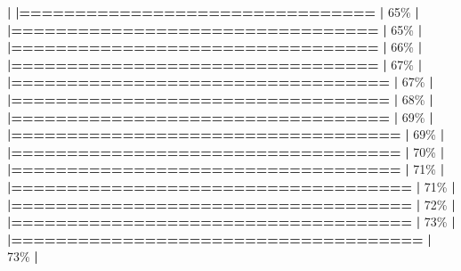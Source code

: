 \documentclass[
]{book}
\newenvironment{Shaded}{\begin{snugshade}}{\end{snugshade}}
\newcommand{\DecValTok}[1]{\textcolor[rgb]{0.00,0.00,0.81}{#1}}
\newcommand{\ErrorTok}[1]{\textcolor[rgb]{0.64,0.00,0.00}{\textbf{#1}}}
\newcommand{\NormalTok}[1]{#1}
\newcommand{\SpecialCharTok}[1]{\textcolor[rgb]{0.81,0.36,0.00}{\textbf{#1}}}
\begin{document}
\begin{Shaded}
\begin{Highlighting}[]
  \SpecialCharTok{|}                                                        
  \ErrorTok{|================================}                  \ErrorTok{|}  \DecValTok{65}\NormalTok{\%}
  \SpecialCharTok{|}                                                        
  \ErrorTok{|=================================}                 \ErrorTok{|}  \DecValTok{65}\NormalTok{\%}
  \SpecialCharTok{|}                                                        
  \ErrorTok{|=================================}                 \ErrorTok{|}  \DecValTok{66}\NormalTok{\%}
  \SpecialCharTok{|}                                                        
  \ErrorTok{|=================================}                 \ErrorTok{|}  \DecValTok{67}\NormalTok{\%}
  \SpecialCharTok{|}                                                        
  \ErrorTok{|==================================}                \ErrorTok{|}  \DecValTok{67}\NormalTok{\%}
  \SpecialCharTok{|}                                                        
  \ErrorTok{|==================================}                \ErrorTok{|}  \DecValTok{68}\NormalTok{\%}
  \SpecialCharTok{|}                                                        
  \ErrorTok{|==================================}                \ErrorTok{|}  \DecValTok{69}\NormalTok{\%}
  \SpecialCharTok{|}                                                        
  \ErrorTok{|===================================}               \ErrorTok{|}  \DecValTok{69}\NormalTok{\%}
  \SpecialCharTok{|}                                                        
  \ErrorTok{|===================================}               \ErrorTok{|}  \DecValTok{70}\NormalTok{\%}
  \SpecialCharTok{|}                                                        
  \ErrorTok{|===================================}               \ErrorTok{|}  \DecValTok{71}\NormalTok{\%}
  \SpecialCharTok{|}                                                        
  \ErrorTok{|====================================}              \ErrorTok{|}  \DecValTok{71}\NormalTok{\%}
  \SpecialCharTok{|}                                                        
  \ErrorTok{|====================================}              \ErrorTok{|}  \DecValTok{72}\NormalTok{\%}
  \SpecialCharTok{|}                                                        
  \ErrorTok{|====================================}              \ErrorTok{|}  \DecValTok{73}\NormalTok{\%}
  \SpecialCharTok{|}                                                        
  \ErrorTok{|=====================================}             \ErrorTok{|}  \DecValTok{73}\NormalTok{\%}
  \SpecialCharTok{|}                                                        

\end{Highlighting}
\end{Shaded}
\end{document}
